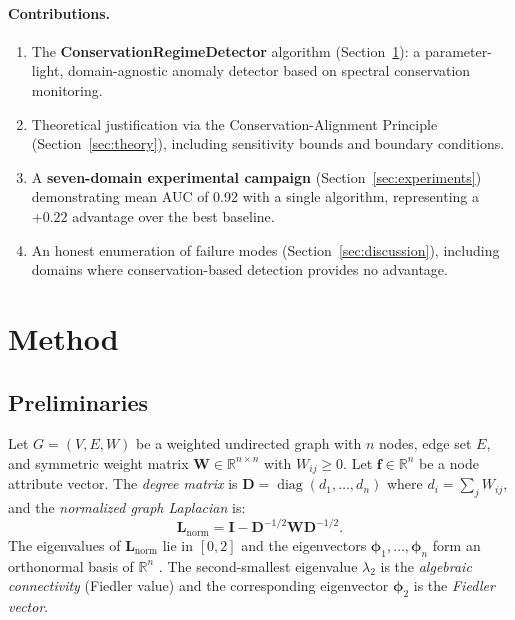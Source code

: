 \documentclass[11pt,a4paper]{article}
\newcommand{\R}{\mathbb{R}}
\newcommand{\bff}{\mathbf{f}}
\newcommand{\bL}{\mathbf{L}}
\newcommand{\bW}{\mathbf{W}}
\newcommand{\bD}{\mathbf{D}}
\newcommand{\bphi}{\boldsymbol{\phi}}
\DeclareMathOperator{\diag}{diag}
\begin{document}
\paragraph{Contributions.}
\begin{enumerate}[leftmargin=*,itemsep=2pt]
  \item The \textbf{ConservationRegimeDetector} algorithm (Section~\ref{sec:method}):
        a parameter-light, domain-agnostic anomaly detector based on spectral
        conservation monitoring.
  \item Theoretical justification via the Conservation-Alignment Principle
        (Section~\ref{sec:theory}), including sensitivity bounds and boundary
        conditions.
  \item A \textbf{seven-domain experimental campaign} (Section~\ref{sec:experiments})
        demonstrating mean AUC of 0.92 with a single algorithm, representing a
        $+0.22$ advantage over the best baseline.
  \item An honest enumeration of failure modes (Section~\ref{sec:discussion}),
        including domains where conservation-based detection provides no advantage.
\end{enumerate}

\section{Method}\label{sec:method}

\subsection{Preliminaries}

Let $G = (V, E, W)$ be a weighted undirected graph with $n$ nodes, edge set $E$,
and symmetric weight matrix $\bW \in \R^{n \times n}$ with $W_{ij} \geq 0$.
Let $\bff \in \R^n$ be a node attribute vector.  The \emph{degree matrix} is
$\bD = \diag(d_1, \ldots, d_n)$ where $d_i = \sum_j W_{ij}$, and the
\emph{normalized graph Laplacian} is:
\begin{equation}\label{eq:laplacian}
  \bL_{\mathrm{norm}} = \mathbf{I} - \bD^{-1/2} \bW \bD^{-1/2}.
\end{equation}
The eigenvalues of $\bL_{\mathrm{norm}}$ lie in $[0, 2]$ and the eigenvectors
$\bphi_1, \ldots, \bphi_n$ form an orthonormal basis of $\R^n$
\citep{chung1997spectral}.  The second-smallest eigenvalue $\lambda_2$ is the
\emph{algebraic connectivity} (Fiedler value) and the corresponding eigenvector
$\bphi_2$ is the \emph{Fiedler vector}.
\end{document}
